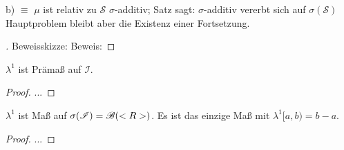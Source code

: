 \begin{remark}
	b) $\equiv$ $\mu$ ist relativ zu $\mathscr{S}$ $\sigma$-additiv; Satz sagt: $\sigma$-additiv vererbt sich auf $\sigma(\mathscr{S})$\\
	Hauptproblem bleibt aber die Existenz einer Fortsetzung.
\end{remark}

\begin{proof}[]
	Beweisskizze: %
	Beweis:
\end{proof}

\begin{proposition}
	$\lambda^1$ ist Prämaß auf $\mathscr{I}$.
\end{proposition}

\begin{proof}
	...
\end{proof}

\begin{conclusion}
	$\lambda^1$ ist Maß auf $\sigma(\mathscr{I}) = \mathscr{B}(<R>)$. Es ist das einzige Maß mit $\lambda^1[a,b) = b - a$.
\end{conclusion}

\begin{proof}
	...
\end{proof}